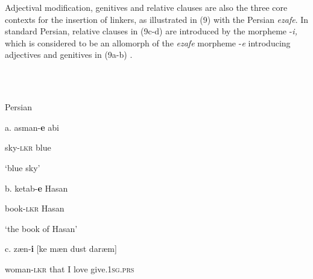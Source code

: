 \documentclass[output=paper]{langsci/langscibook}
\begin{document}
\begin{styleSfondomedioiColorexxi}
Adjectival modification, genitives and relative clauses are also the three core contexts for the insertion of linkers, as illustrated in (9) with the Persian \textit{ezafe}. In standard Persian, relative clauses in (9c-d) are introduced by the morpheme -\textit{i,} which is considered to be an allomorph of the \textit{ezafe} morpheme -\textit{e} introducing adjectives and genitives in (9a-b) \citep{Samvelian2007}.
\end{styleSfondomedioiColorexxi}

\begin{styleSfondomedioiColorexxi}
\ea%
    \label{ex:key:9}
    \gll\\
        \\
    \glt
    \z

          Persian
\end{styleSfondomedioiColorexxi}

\begin{styleSfondomedioiColorexxi}
a.  asman-\textbf{e}   abi     
\end{styleSfondomedioiColorexxi}

\begin{styleSfondomedioiColorexxi}
    sky-\textsc{lkr}    blue
\end{styleSfondomedioiColorexxi}

\begin{styleSfondomedioiColorexxi}
‘blue sky’        
\end{styleSfondomedioiColorexxi}

\begin{styleSfondomedioiColorexxi}
b.  ketab-\textbf{e}   Hasan   
\end{styleSfondomedioiColorexxi}

\begin{styleSfondomedioiColorexxi}
  book-\textsc{lkr}    Hasan
\end{styleSfondomedioiColorexxi}

\begin{styleSfondomedioiColorexxi}
‘the book of Hasan’ 
\end{styleSfondomedioiColorexxi}

\begin{styleSfondomedioiColorexxi}
  c.   zæn-\textbf{i}     [ke  mæn  dust  daræm]
\end{styleSfondomedioiColorexxi}

\begin{styleSfondomedioiColorexxi}
    woman-\textsc{lkr}   that   I   love  give.\textsc{1sg.prs}
\end{styleSfondomedioiColorexxi}
\end{document}
